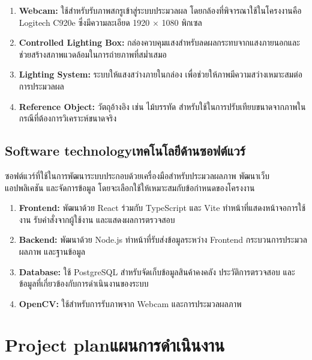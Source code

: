 \begin{enumerate}                                        
    \item \textbf{Webcam:} ใช้สำหรับรับภาพสกรูเข้าสู่ระบบประมวลผล โดยกล้องที่พิจารณาใช้ในโครงงานคือ Logitech C920e ซึ่งมีความละเอียด 1920 × 1080 พิกเซล \cite{logitechC920e}
    \item \textbf{Controlled Lighting Box:} กล่องควบคุมแสงสำหรับลดผลกระทบจากแสงภายนอกและช่วยสร้างสภาพแวดล้อมในการถ่ายภาพที่สม่ำเสมอ
    \item \textbf{Lighting System:} ระบบให้แสงสว่างภายในกล่อง เพื่อช่วยให้ภาพมีความสว่างเหมาะสมต่อการประมวลผล
    \item \textbf{Reference Object:} วัตถุอ้างอิง เช่น ไม้บรรทัด สำหรับใช้ในการปรับเทียบขนาดจากภาพในกรณีที่ต้องการวิเคราะห์ขนาดจริง
\end{enumerate}

\subsection{\ifenglish Software technology\else เทคโนโลยีด้านซอฟต์แวร์\fi}

ซอฟต์แวร์ที่ใช้ในการพัฒนาระบบประกอบด้วยเครื่องมือสำหรับประมวลผลภาพ พัฒนาเว็บแอปพลิเคชัน และจัดการข้อมูล โดยจะเลือกใช้ให้เหมาะสมกับข้อกำหนดของโครงงาน

\begin{enumerate}                                        
    \item \textbf{Frontend:} พัฒนาด้วย React ร่วมกับ TypeScript และ Vite ทำหน้าที่แสดงหน้าจอการใช้งาน รับคำสั่งจากผู้ใช้งาน และแสดงผลการตรวจสอบ
    \item \textbf{Backend:} พัฒนาด้วย Node.js ทำหน้าที่รับส่งข้อมูลระหว่าง Frontend กระบวนการประมวลผลภาพ และฐานข้อมูล
    \item \textbf{Database:} ใช้ PostgreSQL สำหรับจัดเก็บข้อมูลสินค้าคงคลัง ประวัติการตรวจสอบ และข้อมูลที่เกี่ยวข้องกับการดำเนินงานของระบบ
    \item \textbf{OpenCV:} ใช้สำหรับการรับภาพจาก Webcam และการประมวลผลภาพ \cite{opencvCanny2024}
\end{enumerate}

\section{\ifenglish Project plan\else แผนการดำเนินงาน\fi}


